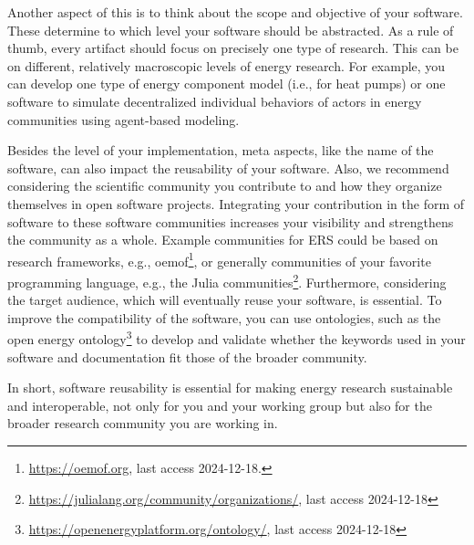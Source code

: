 Another aspect of this is to think about the scope and objective of your software. These determine to which level your software should be abstracted. As a rule of thumb, every artifact should focus on precisely one type of research. This can be on different, relatively macroscopic levels of energy research. For example, you can develop one type of energy component model (i.e., for heat pumps) or one software to simulate decentralized individual behaviors of actors in energy communities using agent-based modeling.

Besides the level of your implementation, meta aspects, like the name of the software, can also impact the reusability of your software. Also, we recommend considering the scientific community you contribute to and how they organize themselves in open software projects. Integrating your contribution in the form of software to these software communities increases your visibility and strengthens the community as a whole. Example communities for \ac{ERS} could be based on research frameworks, e.g., oemof\footnote{\url{https://oemof.org}, last access 2024-12-18.}, or generally communities of your favorite programming language, e.g., the Julia communities\footnote{\url{https://julialang.org/community/organizations/}, last access 2024-12-18}. Furthermore, considering the target audience, which will eventually reuse your software, is essential. To improve the compatibility of the software, you can use ontologies, such as the open energy ontology\footnote{\url{https://openenergyplatform.org/ontology/}, last access 2024-12-18} to develop and validate whether the keywords used in your software and documentation fit those of the broader community.

In short, software reusability is essential for making energy research sustainable and interoperable, not only for you and your working group but also for the broader research community you are working in.


